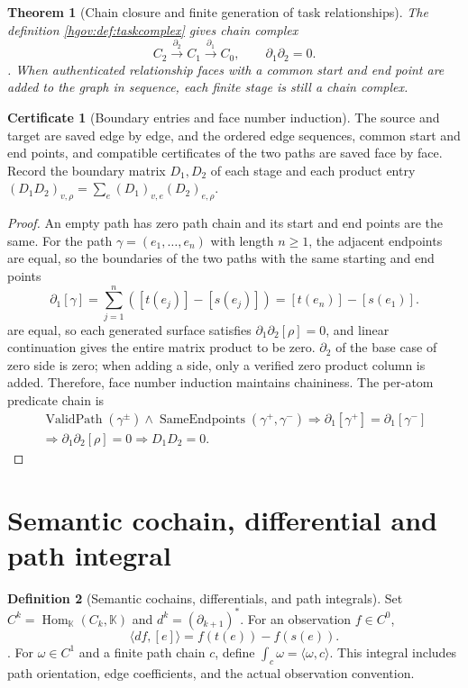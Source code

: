 \documentclass[12pt,a4paper,openany,notitlepage]{report}
\theoremstyle{plain}
\newtheorem{theorem}{Theorem}[chapter]
\theoremstyle{definition}
\newtheorem{definition}[theorem]{Definition}
\newtheorem*{certificate}{Certificate}
\theoremstyle{remark}
\begin{document}
\begin{CJK*}
\begin{theorem}
[Chain closure and finite generation of task relationships]\label{hgov:thm:complex}
The definition \ref{hgov:def:taskcomplex} gives chain complex \[
C_2\xrightarrow{\partial_2}C_1\xrightarrow{\partial_1}C_0,
\qquad \partial_1\partial_2=0.
\]. When authenticated relationship faces with a common start and end point are added to the graph in sequence, each finite stage is still a chain complex.\end{theorem}
\begin{certificate}
[Boundary entries and face number induction]The source and target are saved edge by edge, and the ordered edge sequences, common start and end points, and compatible certificates of the two paths are saved face by face. Record the boundary matrix $D_1,D_2$ of each stage and each product entry $ (D_1D_2)_{v,\rho}=\sum_e(D_1)_{v,e}(D_2)_{e,\rho}$.\end{certificate}
\begin{proof}
An empty path has zero path chain and its start and end points are the same. For the path $\gamma=(e_1,\ldots,e_n)$ with length $n\ge1$, the adjacent endpoints are equal, so the boundaries of the two paths with the same starting and end points \[
\partial_1[\gamma]
=\sum_{j=1}^n([t(e_j)]-[s(e_j)])
=[t(e_n)]-[s(e_1)].
\] are equal, so each generated surface satisfies $\partial_1\partial_2[\rho]=0$, and linear continuation gives the entire matrix product to be zero. $\partial_2$ of the base case of zero side is zero; when adding a side, only a verified zero product column is added. Therefore, face number induction maintains chaininess. The per-atom predicate chain is \[
\begin{gathered}
\operatorname{ValidPath}(\gamma^\pm)\land
\operatorname{SameEndpoints}(\gamma^+,\gamma^-)
\Rightarrow
\partial_1[\gamma^+]=\partial_1[\gamma^-]\\
\Rightarrow\partial_1\partial_2[\rho]=0
\Rightarrow D_1D_2=0.
\end{gathered}
\]\end{proof}


\section { Semantic cochain, differential and path integral }

\begin{definition} [Semantic cochains, differentials, and path integrals]
\label{hgov:def:semanticdiff}
Set $C^k=\operatorname{Hom}_{\mathbb K}(C_k,\mathbb K)$ and $d^k=(\partial_{k+1})^*$. For an observation $f\in C^0$,
\[
\langle df,[e]\rangle=f(t(e))-f(s(e)).
\].
For $\omega\in C^1$ and a finite path chain $c$, define
$\int_c\omega=\langle\omega,c\rangle$.
This integral includes path orientation, edge coefficients, and the actual observation convention.
\end{definition}


\end{CJK*}
\end{document}
